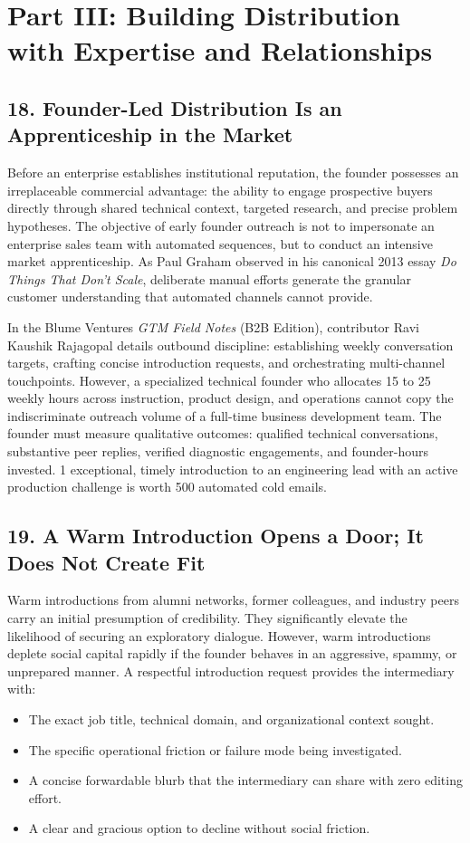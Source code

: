 \section*{Part III: Building Distribution with Expertise and Relationships}

\subsection*{18. Founder-Led Distribution Is an Apprenticeship in the Market}

Before an enterprise establishes institutional reputation, the founder possesses an irreplaceable commercial advantage: the ability to engage prospective buyers directly through shared technical context, targeted research, and precise problem hypotheses. The objective of early founder outreach is not to impersonate an enterprise sales team with automated sequences, but to conduct an intensive market apprenticeship. As Paul Graham observed in his canonical 2013 essay \textit{Do Things That Don't Scale}, deliberate manual efforts generate the granular customer understanding that automated channels cannot provide.

In the Blume Ventures \textit{GTM Field Notes} (B2B Edition), contributor Ravi Kaushik Rajagopal details outbound discipline: establishing weekly conversation targets, crafting concise introduction requests, and orchestrating multi-channel touchpoints. However, a specialized technical founder who allocates 15 to 25 weekly hours across instruction, product design, and operations cannot copy the indiscriminate outreach volume of a full-time business development team. The founder must measure qualitative outcomes: qualified technical conversations, substantive peer replies, verified diagnostic engagements, and founder-hours invested. 1 exceptional, timely introduction to an engineering lead with an active production challenge is worth 500 automated cold emails.

\subsection*{19. A Warm Introduction Opens a Door; It Does Not Create Fit}

Warm introductions from alumni networks, former colleagues, and industry peers carry an initial presumption of credibility. They significantly elevate the likelihood of securing an exploratory dialogue. However, warm introductions deplete social capital rapidly if the founder behaves in an aggressive, spammy, or unprepared manner. A respectful introduction request provides the intermediary with:
\begin{itemize}[leftmargin=*,itemsep=1pt]
  \item The exact job title, technical domain, and organizational context sought.
  \item The specific operational friction or failure mode being investigated.
  \item A concise forwardable blurb that the intermediary can share with zero editing effort.
  \item A clear and gracious option to decline without social friction.
\end{itemize}

